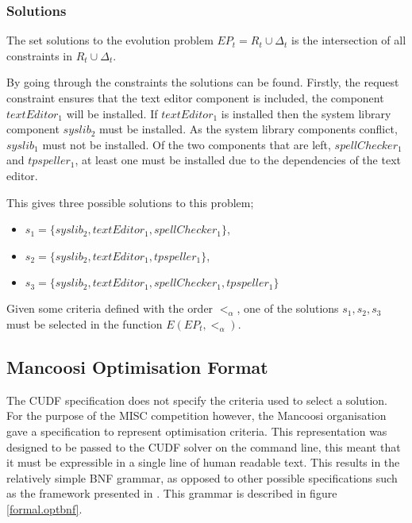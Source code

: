 \subsubsection{Solutions}
The set solutions to the evolution problem $EP_t = R_t \cup \Delta_t$ is the intersection of all constraints in $R_t \cup \Delta_t$.

By going through the constraints the solutions can be found.
Firstly, the request constraint ensures that the text editor component is included, the component $textEditor_1$ will be installed.
If $textEditor_1$ is installed then the system library component $syslib_2$ must be installed.
As the system library components conflict, $syslib_1$ must not be installed.
Of the two components that are left, $spellChecker_1$ and $tpspeller_1$, at least one must be installed due to the dependencies of the text editor.

This gives three possible solutions to this problem;
\begin{itemize}
  \item $s_1 = \{syslib_2, textEditor_1, spellChecker_1\}$,
  \item $s_2 = \{syslib_2, textEditor_1, tpspeller_1\}$,
  \item $s_3 = \{syslib_2, textEditor_1, spellChecker_1, tpspeller_1\}$
\end{itemize}

Given some criteria defined with the order $<_{\alpha}$, one of the solutions $s_1,s_2,s_3$ must be selected in the function $E(EP_t,<_{\alpha})$. 

\subsection{Mancoosi Optimisation Format}
\label{formal.mancoosioptimisationformat}
The CUDF specification does not specify the criteria used to select a solution.
For the purpose of the MISC competition however, the Mancoosi organisation gave a specification to represent optimisation criteria.
This representation was designed to be passed to the CUDF solver on the command line, this meant that it must be expressible in a single line of human readable text.
This results in the relatively simple BNF grammar, as opposed to other possible specifications such as the framework presented in \citep{Treinen2009}. 
This grammar is described in figure \ref{formal.optbnf}.

